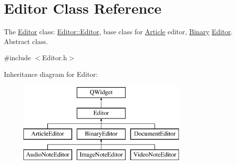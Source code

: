 \hypertarget{class_editor}{\section{Editor Class Reference}
\label{class_editor}
}


The \hyperlink{class_editor}{Editor} class\-: \hyperlink{class_editor_a2e30ad917816a6b1f023460bac7ffddd}{Editor\-::\-Editor}, base class for \hyperlink{class_article}{Article} editor, \hyperlink{class_binary}{Binary} \hyperlink{class_editor}{Editor}. Abstract class.  




{\ttfamily \#include $<$Editor.\-h$>$}

Inheritance diagram for Editor\-:\begin{figure}[H]
\begin{center}
\leavevmode
\includegraphics[height=4.000000cm]{class_editor}
\end{center}
\end{figure}

